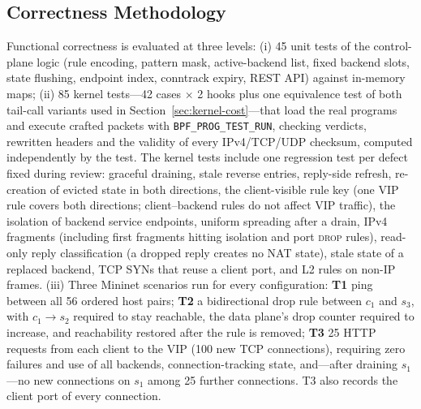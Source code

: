 \documentclass[conference]{IEEEtran}
\begin{document}
\subsection{Correctness Methodology}
Functional correctness is evaluated at three levels: (i) 45 unit tests of the
control-plane logic (rule encoding, pattern mask, active-backend list, fixed
backend slots, state flushing, endpoint index, conntrack expiry, REST API)
against in-memory maps; (ii) 85 kernel tests---42 cases $\times$ 2 hooks plus
one equivalence test of both tail-call variants used in
Section~\ref{sec:kernel-cost}---that load the real
programs and execute crafted packets with \texttt{BPF\_PROG\_TEST\_RUN},
checking verdicts, rewritten headers and the validity of every
IPv4/TCP/UDP checksum, computed independently by the test. The kernel tests
include one regression test per defect fixed during review: graceful
draining, stale reverse entries, reply-side refresh, re-creation of evicted
state in both directions, the client-visible rule key (one VIP rule covers
both directions; client--backend rules do not affect VIP traffic), the
isolation of backend service endpoints, uniform spreading after a drain,
IPv4 fragments (including first fragments hitting isolation and port
\textsc{drop} rules), read-only reply classification (a dropped reply creates
no NAT state), stale state of a replaced backend, TCP SYNs that reuse a client
port, and L2 rules on non-IP frames. (iii) Three Mininet
scenarios run for every configuration: \textbf{T1} ping between all 56
ordered host pairs; \textbf{T2} a bidirectional drop rule between $c_1$ and
$s_3$, with $c_1 \to s_2$ required to stay reachable, the data plane's drop
counter required to increase, and reachability restored after the rule is
removed; \textbf{T3} 25 HTTP requests from each client to the VIP (100 new
TCP connections), requiring zero failures and use of all backends,
connection-tracking state, and---after draining $s_1$---no new connections on
$s_1$ among 25 further connections. T3 also records the client port of
every connection.
\end{document}
